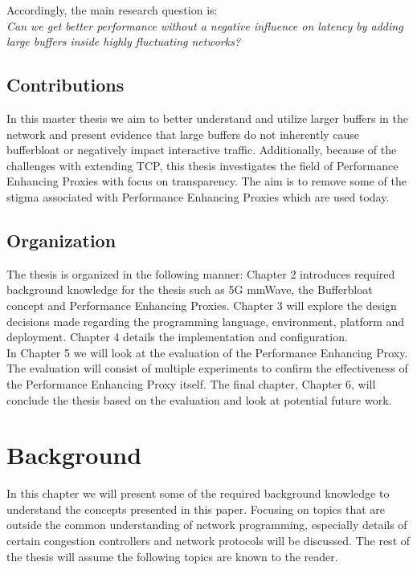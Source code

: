 \documentclass[a4paper,english, 12pt]{report}
\begin{document}
Accordingly, the main research question is:\\
\textit{Can we get better performance without a negative influence on latency by adding large buffers inside highly fluctuating networks?}

\section{Contributions}
In this master thesis we aim to better understand and utilize larger buffers in the network and present evidence that large buffers do not inherently cause bufferbloat or negatively impact interactive traffic. Additionally, because of the challenges with extending TCP\cite{tcp_extendable}, this thesis investigates the field of Performance Enhancing Proxies with focus on transparency. The aim is to remove some of the stigma associated with Performance Enhancing Proxies which are used today.

\section{Organization}
The thesis is organized in the following manner: Chapter 2 introduces required background knowledge for the thesis such as 5G mmWave, the Bufferbloat concept and Performance Enhancing Proxies. Chapter 3 will explore the design decisions made regarding the programming language, environment, platform and deployment. Chapter 4 details the implementation and configuration.\\

In Chapter 5 we will look at the evaluation of the Performance Enhancing Proxy. The evaluation will consist of multiple experiments to confirm the effectiveness of the Performance Enhancing Proxy itself. The final chapter, Chapter 6, will conclude the thesis based on the evaluation and look at potential future work.
\chapter{Background}

In this chapter we will present some of the required background knowledge to understand the concepts presented in this paper. Focusing on topics that are outside the common understanding of network programming, especially details of certain congestion controllers and network protocols will be discussed. The rest of the thesis will assume the following topics are known to the reader.\\
\end{document}
